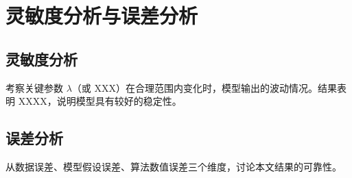 \section{灵敏度分析与误差分析}

\subsection{灵敏度分析}
考察关键参数 $\lambda$（或 XXX）在合理范围内变化时，模型输出的波动情况。结果表明 XXXX，说明模型具有较好的稳定性。

\subsection{误差分析}
从数据误差、模型假设误差、算法数值误差三个维度，讨论本文结果的可靠性。
